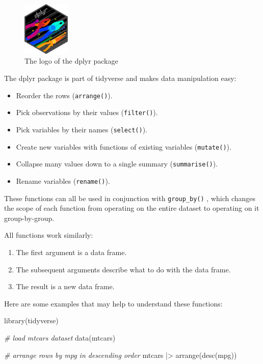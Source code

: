 \documentclass[
  12pt,
  oneside]{book}
\newenvironment{Shaded}{\begin{snugshade}}{\end{snugshade}}
\newcommand{\CommentTok}[1]{\textcolor[rgb]{0.56,0.35,0.01}{\textit{#1}}}
\newcommand{\FunctionTok}[1]{\textcolor[rgb]{0.00,0.00,0.00}{#1}}
\newcommand{\NormalTok}[1]{#1}
\newcommand{\SpecialCharTok}[1]{\textcolor[rgb]{0.00,0.00,0.00}{#1}}
\providecommand{\tightlist}{%
  \setlength{\itemsep}{0pt}\setlength{\parskip}{0pt}}
\theoremstyle{definition}
\theoremstyle{definition}
\theoremstyle{definition}
\theoremstyle{definition}
\theoremstyle{remark}
\begin{document}
\begin{figure}
\centering
\includegraphics[width=0.2\textwidth,height=\textheight]{fig/dplyr-logo.png}
\caption{\label{fig:dplyr-logo} The logo of the dplyr package}
\end{figure}

The dplyr package is part of tidyverse and makes data manipulation easy:

\begin{itemize}
\tightlist
\item
  Reorder the rows (\texttt{arrange()}).
\item
  Pick observations by their values (\texttt{filter()}).
\item
  Pick variables by their names (\texttt{select()}).
\item
  Create new variables with functions of existing variables
  (\texttt{mutate()}).
\item
  Collapse many values down to a single summary (\texttt{summarise()}).
\item
  Rename variables (\texttt{rename()}).
\end{itemize}

These functions can all be used in conjunction with \texttt{group\_by()} , which changes the scope of each function from operating on the entire dataset to operating on it group-by-group.

All functions work similarly:

\begin{enumerate}
\def\labelenumi{\arabic{enumi}.}
\tightlist
\item
  The first argument is a data frame.
\item
  The subsequent arguments describe what to do with the data frame.
\item
  The result is a new data frame.
\end{enumerate}

Here are some examples that may help to understand these functions:

\begin{Shaded}
\begin{Highlighting}[]
\FunctionTok{library}\NormalTok{(tidyverse)}

\CommentTok{\# load mtcars dataset}
\FunctionTok{data}\NormalTok{(mtcars)}

\CommentTok{\# arrange rows by mpg in descending order}
\NormalTok{mtcars }\SpecialCharTok{|\textgreater{}} 
  \FunctionTok{arrange}\NormalTok{(}\FunctionTok{desc}\NormalTok{(mpg))}
\end{Highlighting}
\end{Shaded}
\end{document}
